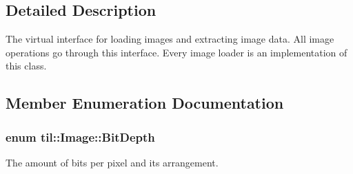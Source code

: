 \subsection{Detailed Description}
The virtual interface for loading images and extracting image data. All image operations go through this interface. Every image loader is an implementation of this class.

\subsection{Member Enumeration Documentation}
\hypertarget{classtil_1_1_image_a621d337ba744563ed6bde962e08dfbc8}{
\subsubsection[{BitDepth}]{\setlength{\rightskip}{0pt plus 5cm}enum {\bf til::Image::BitDepth}}}
\label{classtil_1_1_image_a621d337ba744563ed6bde962e08dfbc8}


The amount of bits per pixel and its arrangement. 

